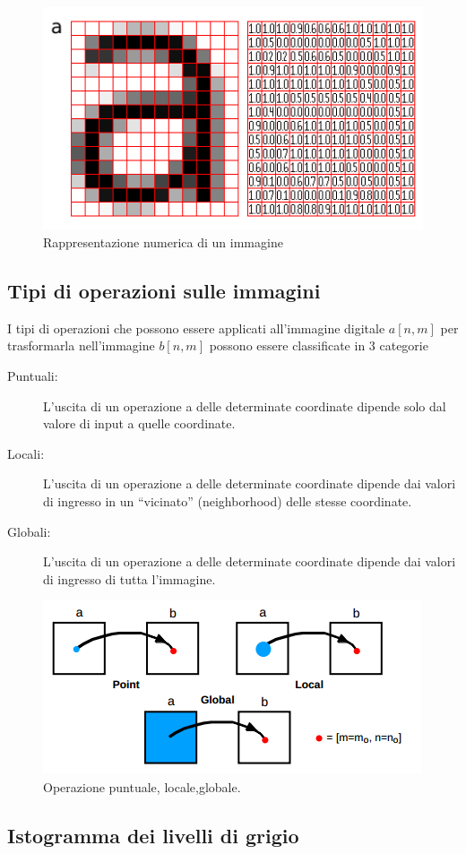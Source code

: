 \begin{figure}
\centering
\includegraphics[width=.5\textwidth]{img/image-grid.png}
\caption{Rappresentazione numerica di un immagine}\label{fig:image-grid}
\end{figure}

\subsection{Tipi di operazioni sulle immagini}
I tipi di operazioni che possono essere applicati all'immagine digitale $a[n,m]$
per trasformarla nell'immagine $b[n,m]$ possono essere classificate in 3 categorie

\begin{description}
\item[Puntuali:] 	L'uscita di un operazione a delle determinate coordinate dipende solo dal valore di input a quelle coordinate.
\item[Locali: ] L'uscita di un operazione a delle determinate coordinate dipende dai valori di ingresso in un ``vicinato'' (neighborhood) delle stesse coordinate.
\item[Globali: ] L'uscita di un operazione a delle determinate coordinate dipende dai valori di ingresso di tutta l'immagine.
\end{description}


\begin{figure}
\centering
\includegraphics[width=.5\textwidth]{img/puntuale-locale-globale.png}
\caption{Operazione puntuale, locale,globale.}\label{fig:puntuale-locale-globale}
\end{figure}

\subsection{Istogramma dei livelli di grigio}

